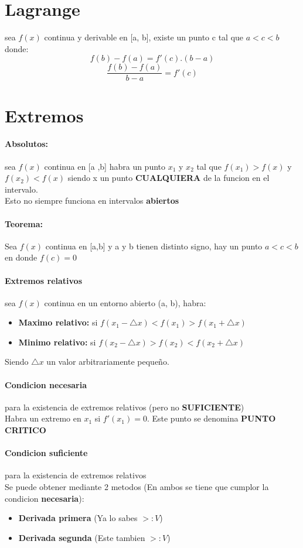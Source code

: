 \documentclass[11pt]{article}
\begin{document}
\section{Lagrange}
sea $f(x)$ continua y derivable en [a, b], existe un punto c tal que $a < c < b$ donde:
\begin{equation}
	f(b)-f(a) = f'(c).(b-a)
\end{equation}
\begin{equation}
	\dfrac{f(b)-f(a)}{b-a} = f'(c)
\end{equation}
\section{Extremos}
\paragraph{Absolutos: } sea $f(x)$ continua en [a ,b] habra un punto $x_1$ y $x_2$ tal que $f(x_1) > f(x)$ y $f(x_2) < f(x)$ siendo x un punto \textbf{CUALQUIERA} de la funcion en el intervalo.\\
Esto no siempre funciona en intervalos \textbf{abiertos}
\paragraph{Teorema: }Sea $f(x)$ continua en [a,b] y a y b tienen distinto signo, hay un punto $a < c < b$ en donde $f(c) = 0$
\paragraph{Extremos relativos} sea $f(x)$ continua en un entorno abierto (a, b), habra:
\begin{itemize}
	\item \textbf{Maximo relativo:} si $f(x_1-\bigtriangleup x)<f(x_1)> f(x_1+\bigtriangleup x)$
	\item \textbf{Minimo relativo:} si $f(x_2-\bigtriangleup x)>f(x_2)< f(x_2+\bigtriangleup x)$
\end{itemize}
Siendo $\bigtriangleup x$ un valor arbitrariamente pequeño.
\paragraph{Condicion necesaria}para la existencia de extremos relativos (pero no \textbf{SUFICIENTE})\\
Habra un extremo en $x_1$ si $f'(x_1) = 0$. Este punto se denomina \textbf{PUNTO CRITICO}
\paragraph{Condicion suficiente} para la existencia de extremos relativos\\
Se puede obtener mediante 2 metodos (En ambos se tiene que cumplor la condicion \textbf{necesaria}):
\begin{itemize}
	\item \textbf{Derivada primera} (Ya lo sabes $>:V$)
	\item \textbf{Derivada segunda} (Este tambien $>:V$)
\end{itemize}
\end{document}
